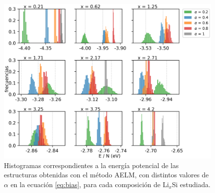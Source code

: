 \begin{figure}[h!]
    \centering
    \includegraphics[width=\textwidth]{Silicio/caracterizacion/resultados/introduccion/energias.png}
    \caption{Histogramas correspondientes a la energía potencial de las 
    estructuras obtenidas con el método AELM, con distintos valores de $\alpha$
    en la ecuación \ref{eq:bias}, para cada composición de Li$_x$Si estudiada.}
    \label{fig:energias}
\end{figure}

